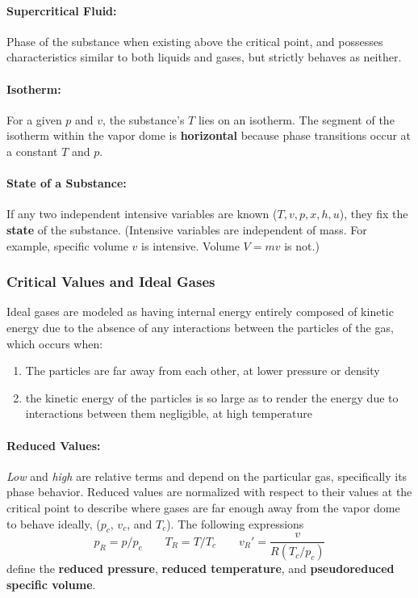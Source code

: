 \paragraph{Supercritical Fluid:} Phase of the substance when existing above the critical point, and possesses characteristics similar to both liquids and gases, but strictly behaves as neither.
\paragraph{Isotherm:} For a given $p$ and $v$, the substance's $T$ lies on an isotherm. The segment of the isotherm within the vapor dome is \textbf{horizontal} because phase transitions occur at a constant $T$ and $p$.

\paragraph{State of a Substance:} If any two independent intensive variables are known ($T, v, p, x, h, u$), they fix the \textbf{state} of the substance. (Intensive variables are independent of mass. For example, specific volume $v$ is intensive. Volume $V=mv$ is not.)


\subsubsection{Critical Values and Ideal Gases}
Ideal gases are modeled as having internal energy entirely composed of kinetic energy due to the absence of any interactions between the particles of the gas, which occurs when:
\begin{enumerate}
    \item The particles are far away from each other, at lower pressure or density 
    \item the kinetic energy of the particles is so large as to render the energy due to interactions between them negligible, at high temperature
\end{enumerate}
\paragraph{Reduced Values:}
\emph{Low} and \emph{high} are relative terms and depend on the particular gas, specifically its phase behavior.  Reduced values are normalized with respect to their values at the critical point to describe where gases are far enough away from the vapor dome to behave ideally,
($p_c$, $v_c$, and $T_c$). The following expressions 
\begin{equation}
p_R = p/p_c \qquad T_R = T/T_c \qquad v_R' = \frac{v}{R(T_c/p_c)}
\end{equation}
define the \textbf{reduced pressure}, \textbf{reduced temperature}, and \textbf{pseudoreduced specific volume}.
